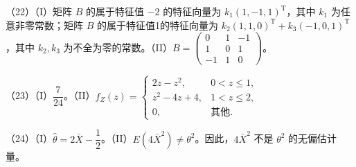 \documentclass[UTF8,12pt]{ctexart}
\begin{document}
（22）（I）矩阵 \(\displaystyle B\) 的属于特征值 \(\displaystyle -2\) 的特征向量为 \(\displaystyle k_1(1,\allowbreak -1,\allowbreak 1)^{\mathrm T}\)，其中 \(\displaystyle k_1\) 为任意非零常数；矩阵 \(\displaystyle B\) 的属于特征值1的特征向量为 \(\displaystyle k_2(1,\allowbreak 1,\allowbreak 0)^{\mathrm T}+k_3(-1,\allowbreak 0,\allowbreak 1)^{\mathrm T}\)，其中 \(\displaystyle k_2,\allowbreak k_3\) 为不全为零的常数。（II）\(\displaystyle B=\begin{pmatrix}0&1&-1\\1&0&1\\-1&1&0\end{pmatrix}\)。


（23）（I）\(\displaystyle \dfrac{\displaystyle 7}{\displaystyle 24}\)。（II）\(\displaystyle f_Z(z)=\begin{cases}2z-z^2,\allowbreak &0<z\le1,\allowbreak \\z^2-4z+4,\allowbreak &1<z\le2,\allowbreak \\0,\allowbreak &\text{其他}.\end{cases}\)


（24）（I）\(\displaystyle \hat\theta=2\bar X-\dfrac{\displaystyle 1}{\displaystyle 2}\)。（II）\(\displaystyle E(4\bar X^2)\ne\theta^2\)。因此，\(\displaystyle 4\bar X^2\) 不是 \(\displaystyle \theta^2\) 的无偏估计量。
\end{document}
